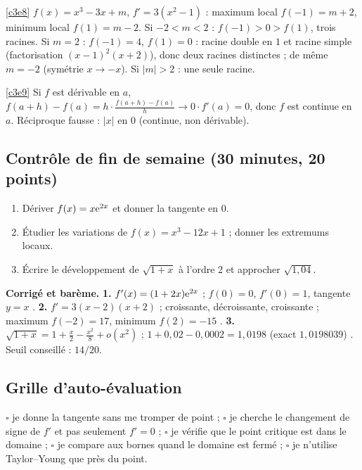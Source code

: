 \begin{corrige}{\ref{c3e8}}
$f(x)=x^3-3x+m$, $f'=3(x^2-1)$ : maximum local $f(-1)=m+2$, minimum local $f(1)=m-2$. Si $-2<m<2$ : $f(-1)>0>f(1)$, trois racines. Si $m=2$ : $f(-1)=4$, $f(1)=0$ : racine double en $1$ et racine simple (factorisation $(x-1)^2(x+2)$), donc deux racines distinctes ; de même $m=-2$ (symétrie $x\to-x$). Si $|m|>2$ : une seule racine.
\end{corrige}
\begin{corrige}{\ref{c3e9}}
Si $f$ est dérivable en $a$, $f(a+h)-f(a)=h\cdot\frac{f(a+h)-f(a)}h\to0\cdot f'(a)=0$, donc $f$ est continue en $a$. Réciproque fausse : $|x|$ en $0$ (continue, non dérivable).
\end{corrige}
\else{}\fi

\subsection{Contrôle de fin de semaine (30 minutes, 20 points)}
\begin{enumerate}
 \item {} Dériver $f(x)=x\mathrm{e}^{2x}$ et donner la tangente en $0$.
 \item {} Étudier les variations de $f(x)=x^3-12x+1$ ; donner les extremums locaux.
 \item {} Écrire le développement de $\sqrt{1+x}$ à l'ordre 2 et approcher $\sqrt{1{,}04}$.
\end{enumerate}
\ifcorr
\textbf{Corrigé et barème.} \textbf{1.} $f'(x)=(1+2x)\mathrm{e}^{2x}$  ; $f(0)=0$, $f'(0)=1$, tangente $y=x$ . \textbf{2.} $f'=3(x-2)(x+2)$  ; croissante, décroissante, croissante  ; maximum $f(-2)=17$, minimum $f(2)=-15$ . \textbf{3.} $\sqrt{1+x}=1+\frac x2-\frac{x^2}8+o(x^2)$  ; $1+0{,}02-0{,}0002=1{,}0198$ (exact $1{,}0198039$) . Seuil conseillé : $14/20$.
\fi

\subsection{Grille d'auto-évaluation}
$\square$ je donne la tangente sans me tromper de point ; $\square$ je cherche le changement de signe de $f'$ et pas seulement $f'=0$ ; $\square$ je vérifie que le point critique est dans le domaine ; $\square$ je compare aux bornes quand le domaine est fermé ; $\square$ je n'utilise Taylor--Young que près du point.
